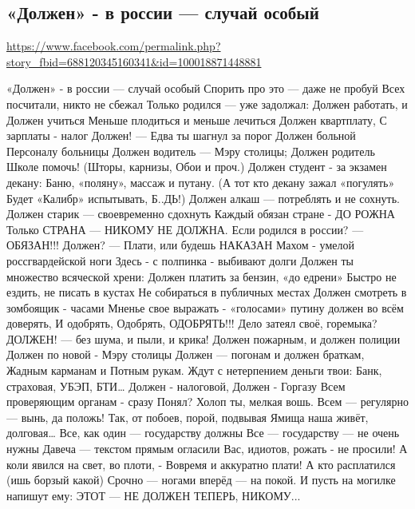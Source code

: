  
 

\subsection{«Должен» - в россии --- случай особый}
\label{sec:27_10_2020.fb.nata_ignatava.1.dolzhen}

\url{https://www.facebook.com/permalink.php?story_fbid=688120345160341&id=100018871448881}

«Должен» - в россии --- случай особый
Спорить про это --- даже не пробуй
Всех посчитали, никто не сбежал
Только родился --- уже задолжал:
Должен работать, и Должен учиться
Меньше плодиться и меньше лечиться
Должен квартплату, С зарплаты - налог
Должен! --- Едва ты шагнул за порог
Должен больной Персоналу больницы
Должен водитель --- Мэру столицы;
Должен родитель Школе помочь!
(Шторы, карнизы, Обои и проч.)
Должен студент - за экзамен декану:
Баню, «поляну», массаж и путану.
(А тот кто декану зажал «погулять»
Будет «Калибр» испытывать, Б..ДЬ!)
Должен алкаш --- потреблять и не сохнуть.
Должен старик --- своевременно сдохнуть
Каждый обязан стране - ДО РОЖНА
Только СТРАНА --- НИКОМУ НЕ ДОЛЖНА.
Если родился в россии? --- ОБЯЗАН!!!
Должен? --- Плати, или будешь НАКАЗАН
Махом - умелой россгвардейской ноги
Здесь - с полпинка - выбивают долги
Должен ты множество всяческой хрени:
Должен платить за бензин, «до едрени»
Быстро не ездить, не писать в кустах
Не собираться в публичных местах
Должен смотреть в зомбоящик - часами
Мненье свое выражать - «голосами»
путину должен во всём доверять,
И одобрять, Одобрять, ОДОБРЯТЬ!!!
Дело затеял своё, горемыка?
ДОЛЖЕН! --- без шума, и пыли, и крика!
Должен пожарным, и должен полиции
Должен по новой - Мэру столицы
Должен --- погонам и должен браткам,
Жадным карманам и Потным рукам.
Ждут с нетерпением деньги твои:
Банк, страховая, УБЭП, БТИ…
Должен - налоговой, Должен - Горгазу
Всем проверяющим органам - сразу
Понял? Холоп ты, мелкая вошь.
Всем --- регулярно --- вынь, да положь!
Так, от побоев, порой, подвывая
Ямища наша живёт, долговая…
Все, как один --- государству должны
Все --- государству --- не очень нужны
Давеча --- текстом прямым огласили
Вас, идиотов, рожать - не просили!
А коли явился на свет, во плоти, -
Вовремя и аккуратно плати!
А кто расплатился (ишь борзый какой)
Срочно --- ногами вперёд --- на покой.
И пусть на могилке напишут ему:
ЭТОТ --- НЕ ДОЛЖЕН ТЕПЕРЬ, НИКОМУ...
